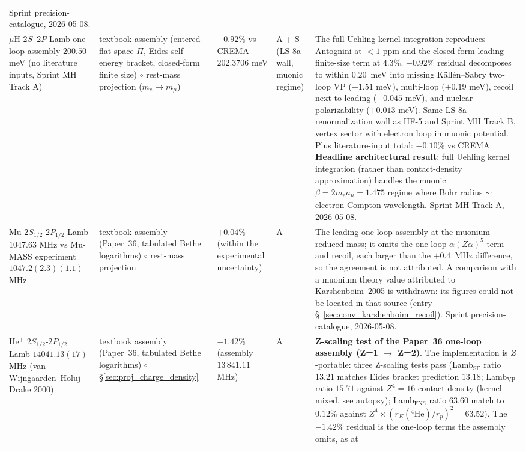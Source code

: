\documentclass[11pt]{article}
\begin{document}
{\begin{longtable}{p{3.8cm} p{2.5cm} p{1.5cm} p{1.4cm} p{4.5cm}}
Sprint precision-catalogue, 2026-05-08.  \\
$\mu$H 2$S$--2$P$ Lamb one-loop assembly $200.50$ meV (no literature
inputs, Sprint MH Track A) & textbook assembly (entered flat-space
$\Pi$, Eides self-energy bracket, closed-form finite size) $\circ$ rest-mass projection
($m_e \to m_\mu$) & $-0.92\%$ vs CREMA $202.3706$ meV & A + S
(LS-8a wall, muonic regime)
& The full Uehling kernel integration reproduces Antognini at $<1$ ppm and the
closed-form leading finite-size term at $4.3\%$.  $-0.92\%$ residual decomposes to within $0.20$~meV into missing K\"all\'en--Sabry two-loop VP ($+1.51$ meV),
multi-loop ($+0.19$ meV), recoil next-to-leading ($-0.045$ meV), and
nuclear polarizability ($+0.013$ meV).  Same LS-8a renormalization
wall as HF-5 and Sprint MH Track B, vertex sector with electron loop
in muonic potential.  Plus literature-input total: $-0.10\%$ vs CREMA.
\textbf{Headline architectural result}: full Uehling kernel integration
(rather than contact-density approximation) handles the muonic
$\beta = 2 m_e a_\mu = 1.475$ regime where Bohr radius $\sim$ electron
Compton wavelength.  Sprint MH Track A, 2026-05-08. \\
Mu 2$S_{1/2}$-2$P_{1/2}$ Lamb $1047.63$ MHz vs Mu-MASS experiment
$1047.2(2.3)(1.1)$ MHz~\cite{ohayon2022} & textbook assembly (Paper~36, tabulated Bethe logarithms)
$\circ$ rest-mass projection & $+0.04\%$ (within the experimental
uncertainty) & A & The leading one-loop assembly at the muonium reduced
mass; it omits the one-loop $\alpha(Z\alpha)^5$ term and recoil, each
larger than the $+0.4$~MHz difference, so the agreement is not
attributed.  A comparison with a muonium theory value
attributed to Karshenboim~2005 is withdrawn: its figures could not be
located in that source (entry
\S~\ref{sec:conv_karshenboim_recoil}).
Sprint precision-catalogue, 2026-05-08. \\
He$^+$ 2$S_{1/2}$-2$P_{1/2}$ Lamb $14041.13(17)$ MHz (van
Wijngaarden--Holuj--Drake 2000) & textbook assembly (Paper~36,
tabulated Bethe logarithms) $\circ$
\S\ref{sec:proj_charge_density} & $-1.42\%$ (assembly
$13\,841.11$ MHz) & A & \textbf{Z-scaling test of the Paper~36
one-loop assembly (Z=1 $\to$ Z=2)}.  The implementation is $Z$-portable:
three Z-scaling tests pass (Lamb$_\text{SE}$ ratio $13.21$
matches Eides bracket prediction $13.18$; Lamb$_\text{VP}$ ratio $15.71$
against $Z^4 = 16$ contact-density (kernel-mixed, see autopsy); Lamb$_\text{FNS}$ ratio $63.60$
match to $0.12\%$ against $Z^4 \times (r_E({}^4\text{He})/r_p)^2 = 63.52$).  The
$-1.42\%$ residual is the one-loop terms the assembly omits, as at

\end{longtable}}
\end{document}
